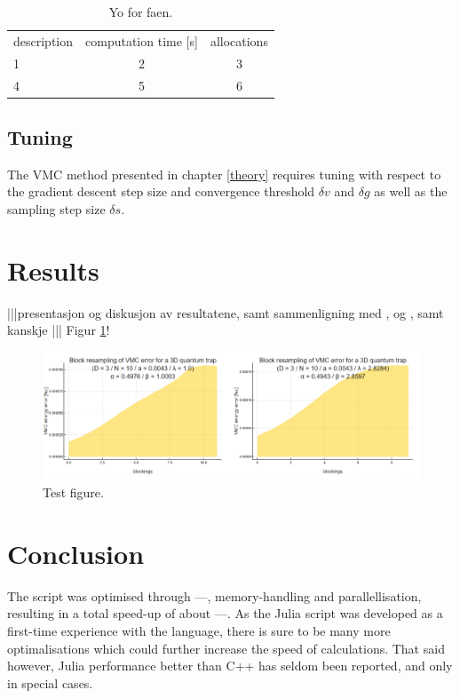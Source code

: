 \documentclass[a4paper,8pt]{article}
\begin{document}
\begin{multicols}{2}
\begin{table}
\begin{tabular}{lcc}
	description & computation time [s] & allocations \\
    1 & 2 & 3 \\
    4 & 5 & 6 \\
\end{tabular}
\caption{Yo for faen.}
\label{optTimes}
\end{table}


\subsection{Tuning}\label{tuning}
The VMC method presented in chapter \ref{theory} requires tuning with respect to the gradient descent step size and convergence threshold $\delta v$ and $\delta g$ as well as the sampling step size $\delta s$.


\section{Results}\label{results}
|||presentasjon og diskusjon av resultatene, samt sammenligning med \cite{SWL}, \cite{DBG} og \cite{DS}, samt kanskje \cite{NMPGHJP}||| Figur \ref{testfig}!

\begin{figure}\label{testfig}
\centering
\includegraphics{figResampling.pdf}
\caption{Test figure.}
\end{figure}

\section{Conclusion}
The script was optimised through ---, memory-handling and parallellisation, resulting in a total speed-up of about ---. As the Julia script was developed as a first-time experience with the language, there is sure to be many more optimalisations which could further increase the speed of calculations. That said however, Julia performance better than C++ has seldom been reported, and only in special cases.


\end{multicols}


\end{document}
